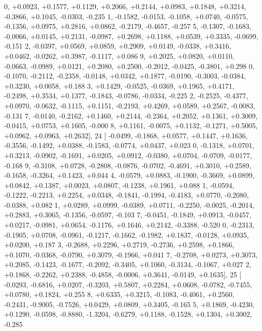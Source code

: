 \begin{DoxyCode}
      0, +0.0923, +0.1577, +0.1129, +0.2066, +0.2144, +0.0983, +0.1848, +0.3214, -0.3866, +0.1045, -0.0303, -0.235
      1, -0.1582, -0.0153, -0.1058, +0.0740, -0.0575, -0.1356, +0.0975, +0.2816, +0.0862, -0.2179, -0.4657, -0.257
      5, -0.1307, -0.1683, -0.0066, +0.0145, +0.2131, -0.0987, +0.2698, +0.1188, +0.0539, +0.3335, -0.0699, -0.151
      2, -0.0397, +0.0569, +0.0859, +0.2909, +0.0149, -0.0338, +0.3416, +0.0462, -0.0262, +0.3987, -0.1117, +0.086
      9, +0.2025, +0.0820, +0.0110, -0.0663, -0.0989, +0.0121, +0.2080, +0.2500, -0.2012, -0.0425, -0.3801, +0.298
      0, -0.1070, -0.2112, -0.2358, -0.0148, +0.0342, +0.1877, -0.0190, -0.3003, -0.0384, +0.3230, +0.0058, +0.188
      3, +0.1429, -0.0525, -0.0369, +0.1965, +0.4171, -0.2498, +0.3534, +0.1377, -0.1843, -0.0786, -0.0334, -0.225
      2, -0.2525, -0.4377, +0.0970, -0.0632, -0.1115, +0.1151, -0.2193, +0.4269, +0.0589, +0.2567, -0.0083, -0.131
      7, -0.0140, -0.2162, +0.1460, +0.2144, -0.2364, +0.2052, +0.1361, +0.3009, -0.0415, +0.0753, +0.1605, -0.000
      8, +0.1161, -0.0075, +0.1132, -0.1271, +0.5005, +0.0962, +0.0963, +0.2632],
24 [ -0.0499, -0.1868, +0.0577, +0.1447, +0.1636, -0.3556, -0.1492, +0.0388, -0.1583, -0.0774, +0.0437, +0.023
      0, -0.1318, +0.0701, +0.3213, -0.0902, -0.1691, +0.0205, +0.0912, -0.0380, +0.0704, -0.0709, -0.0177, -0.168
      9, -0.3108, +0.0728, -0.2808, -0.0876, -0.0702, -0.4691, +0.3010, +0.2589, -0.1658, -0.3264, +0.1423, +0.044
      4, -0.0579, +0.0883, -0.1900, -0.3669, +0.0899, +0.0842, +0.1387, +0.0023, +0.0807, -0.1238, +0.1961, +0.088
      1, -0.0594, -0.1222, -0.2213, +0.2254, +0.0348, -0.1841, -0.1994, -0.4183, +0.0770, -0.2080, -0.0388, +0.082
      1, +0.0289, +0.0999, -0.0389, +0.0711, -0.2250, -0.0025, -0.2014, +0.2883, +0.3065, -0.1356, -0.0597, -0.103
      7, -0.0451, -0.1849, +0.0913, -0.0457, +0.0217, -0.0981, +0.0654, -0.1176, +0.1646, +0.2142, -0.3388, -0.520
      0, -0.2313, -0.1905, +0.0708, -0.0961, -0.1217, -0.1662, -0.1982, +0.1837, -0.0128, +0.0935, +0.0200, +0.187
      3, -0.2688, +0.2296, +0.2719, -0.2736, +0.2598, +0.1866, +0.1070, -0.0368, -0.0790, +0.3079, -0.1966, +0.041
      7, -0.2708, +0.0273, +0.3073, +0.2085, -0.1423, -0.1677, -0.2092, -0.3405, +0.1060, -0.3134, -0.1067, +0.027
      2, +0.1868, -0.2262, +0.2388, -0.4858, -0.0006, +0.3641, -0.0149, +0.1635],
25 [ -0.0293, -0.6816, +0.0207, -0.3203, +0.5807, +0.2284, +0.0608, -0.0782, -0.7455, +0.0780, +0.1824, +0.255
      8, +0.6335, +0.3215, -0.1083, -0.4061, +0.2560, -0.2431, -0.9005, -0.7526, +0.0429, +0.0809, +0.3405, -0.165
      5, +0.1869, -0.4230, +0.1290, -0.0598, -0.8880, -1.3204, -0.6279, +0.1188, -0.1528, +0.1304, +0.3002, -0.285

\end{DoxyCode}
